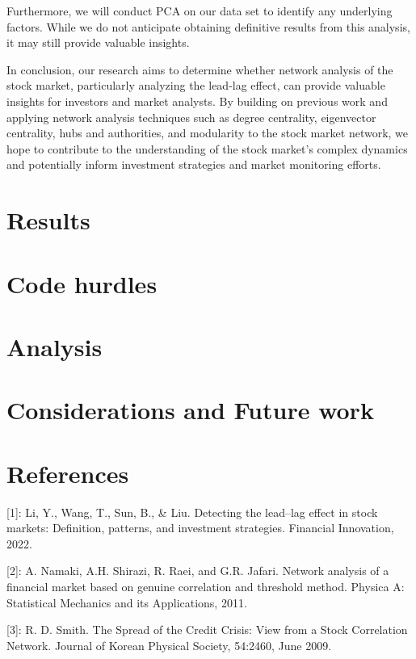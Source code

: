 \documentclass{article}
\begin{document}
Furthermore, we will conduct PCA on our data set to identify any underlying factors. While we do not anticipate obtaining definitive results from this analysis, it may still provide valuable insights.

In conclusion, our research aims to determine whether network analysis of the stock market, particularly analyzing the lead-lag effect, can provide valuable insights for investors and market analysts. By building on previous work and applying network analysis techniques such as degree centrality, eigenvector centrality, hubs and authorities, and modularity to the stock market network, we hope to contribute to the understanding of the stock market's complex dynamics and potentially inform investment strategies and market monitoring efforts.
\section{Results}
\section{Code hurdles}
\section{Analysis}
\section{Considerations and Future work}
\section*{References}
[1]: Li, Y., Wang, T., Sun, B., \& Liu. Detecting the lead–lag effect in stock markets: Definition, patterns, and investment strategies. Financial Innovation, 2022.

[2]: A. Namaki, A.H. Shirazi, R. Raei, and G.R. Jafari. Network analysis of a financial market based on genuine correlation and threshold method. Physica A: Statistical
Mechanics and its Applications, 2011.

[3]: R. D. Smith. The Spread of the Credit Crisis: View
from a Stock Correlation Network. Journal of Korean
Physical Society, 54:2460, June 2009.

\medskip



\small

\end{document}

